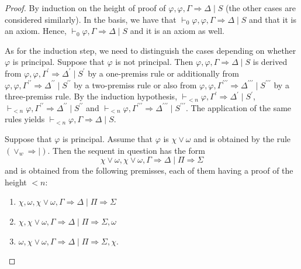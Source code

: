 \documentclass[10pt,a4paper]{article}
\theoremstyle{definition}
\newcommand{\3}{\vspace{.3in}}
\newcommand{\2}{\vspace{.2in}}
\newcommand{\1}{\vspace{.1in}}
\newcommand{\5}{\vspace{.05in}}
\begin{document}
\begin{proof}
By induction on the height of proof of $ \varphi,\varphi,\Gamma
\Rightarrow \Delta \mid S $	(the other cases are considered similarly). In the basis, we have that $ \vdash_0\varphi,\varphi,\Gamma
\Rightarrow \Delta \mid S $ and that it is an axiom. Hence, $ \vdash_0\varphi,\Gamma
\Rightarrow \Delta \mid S $ and it is an axiom as well.

As for the induction step, we need to distinguish the cases depending on whether $ \varphi $ is principal. Suppose that $ \varphi $ is not principal. Then $ \varphi,\varphi,\Gamma
\Rightarrow \Delta \mid S $ is derived from $ \varphi,\varphi,\Gamma^\prime
\Rightarrow \Delta^\prime \mid S^\prime $ by a one-premiss
rule or additionally from $ \varphi,\varphi,\Gamma^{\prime\prime}
\Rightarrow \Delta^{\prime\prime} \mid S^{\prime\prime} $ by a two-premiss rule or also from $ \varphi,\varphi,\Gamma^{\prime\prime\prime}
\Rightarrow \Delta^{\prime\prime\prime} \mid S^{\prime\prime\prime} $ by a three-premiss rule. By the induction hypothesis, $\vdash_{<n} \varphi,\Gamma^\prime
\Rightarrow \Delta^\prime \mid S^\prime $, $\vdash_{<n} \varphi,\Gamma^{\prime\prime}
\Rightarrow \Delta^{\prime\prime} \mid S^{\prime\prime} $ and $\vdash_{<n} \varphi,\Gamma^{\prime\prime\prime}
\Rightarrow \Delta^{\prime\prime\prime} \mid S^{\prime\prime\prime} $. The application of the same rules yields $\vdash_{<n} \varphi,\Gamma
\Rightarrow \Delta \mid S $.

Suppose that $ \varphi $ is principal. Assume that $ \varphi $ is $ \chi\vee\omega $ and is obtained by the rule $ (\vee_w\Rightarrow\mid) $. Then the sequent in question has the form $$ \chi\vee\omega,\chi\vee\omega,\Gamma\Rightarrow\Delta\mid \Pi\Rightarrow\Sigma $$ and is obtained from the following premisses, each of them having a proof of the height $<n$: 
\begin{enumerate}\itemsep=0pt
\item $  \chi,\omega,\chi\vee\omega,\Gamma\Rightarrow\Delta\mid \Pi\Rightarrow\Sigma $
\item $ \chi,\chi\vee\omega,\Gamma\Rightarrow\Delta\mid \Pi\Rightarrow\Sigma,\omega $
\item $ \omega,\chi\vee\omega,\Gamma\Rightarrow\Delta\mid \Pi\Rightarrow\Sigma,\chi $.
\end{enumerate}


\end{proof}
\end{document}
